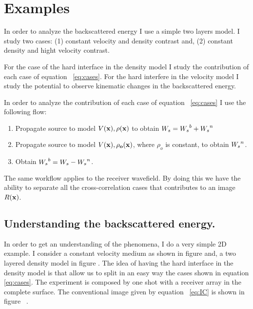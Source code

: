 \section{Examples}
In order to analyze the backscattered energy I use a simple two layers model. I study
 two cases: (1)  constant velocity and density contrast and,
  (2) constant density and hight  velocity contrast.  

For the case of the hard interface in the density model I study the contribution of each case of 
equation ~\ref{eq:cases}. For the hard interfere in the velocity model I study the potential
to observe kinematic changes in the backscattered energy.

In order to analyze the contribution of each case of equation ~\ref{eq:cases} I use the following flow:
\begin{enumerate}
\item Propagate source to model $V(\bf{x}), \rho(\bf{x})$ to obtain ${W_s}={W_s}^b +{W_s}^n$
\item Propagate source to model $V(\bf{x}), \rho_o(\bf{x})$, where
$\rho_o$ is constant, to obtain ${W_s}^n$.
\item Obtain ${W_s}^b= {W_s} -{W_s}^n$.
\end{enumerate}

The same workflow applies to the receiver wavefield. By doing this we have the ability to separate all 
the cross-correlation cases that contributes to an image $R(\bf{x})$.


\subsection{Understanding the backscattered energy.}

In order to get an understanding of the phenomena, I do a very simple 2D example. I consider
a constant velocity medium as shown in figure  and, a two layered density model in figure . The idea of having the 
hard interface in the density model is that allow us to split in an easy way the cases shown in equation \ref{eq:cases}. 
The experiment is composed by one shot with a receiver array in the complete surface. The conventional image
given by equation ~\ref{eq:IC} is shown in figure ~. 


